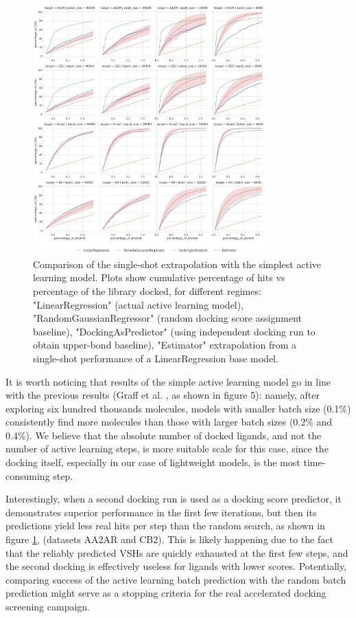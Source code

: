 \begin{figure}[ht]
\centering
\includegraphics[width=0.8\textwidth]{figures/figure_4_iterations.png}
\caption{Comparison of the single-shot extrapolation with the simplest active learning model. Plots show cumulative percentage of hits vs percentage of the library docked, for different regimes: "LinearRegression" (actual active learning model), "RandomGaussianRegressor" (random docking score assignment baseline), "DockingAsPredictor" (using independent docking run to obtain upper-bond baseline), "Estimator" extrapolation from a single-shot performance of a LinearRegression base model.}
\label{fig:fig_4_extrapolation}
\end{figure}

It is worth noticing that results of the simple active learning model go in line with the previous results (Graff et al. \cite{Graff2021AcceleratingLearning}, as shown in figure 5): namely, after exploring six hundred thousands molecules, models with smaller batch size (0.1\%) consistently find more molecules than those with larger batch sizes (0.2\% and 0.4\%). We believe that the absolute number of docked ligands, and not the number of active learning steps, is more suitable scale for this case, since the docking itself, especially in our case of lightweight models, is the most time-consuming step.

Interestingly, when a second docking run is used as a docking score predictor, it demonstrates superior performance in the first few iterations, but then its predictions yield less real hits per step than the random search, as shown in figure \ref{fig:fig_4_extrapolation}, (datasets AA2AR and CB2). This is likely happening due to the fact that the reliably predicted VSHs are quickly exhausted at the first few steps, and the second docking is effectively useless for ligands with lower scores. Potentially, comparing success of the active learning batch prediction with the random batch prediction might serve as a stopping criteria for the real accelerated docking screening campaign.

